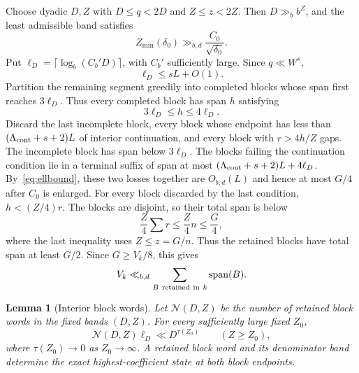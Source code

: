 \documentclass[a4paper,10pt]{amsart}
\newtheorem{lemma}[theorem]{Lemma}
\theoremstyle{remark}
\newcommand{\Span}{\operatorname{span}}
\begin{document}
Choose dyadic $D,Z$ with $D\le q<2D$ and $Z\le z<2Z$. Then
$D\gg_b b^Z$, and the least admissible band satisfies
\begin{equation}\label{eq:zmin}
 Z_{\min}(\delta_0)\gg_{b,d}\frac{C_0}{\sqrt{\delta_0}}.
\end{equation}
Put $\ell_D=\lceil\log_b(C_b'D)\rceil$, with $C_b'$ sufficiently large. Since
$q\ll W^s$,
\begin{equation}\label{eq:ellbound}
 \ell_D\le sL+O(1).
\end{equation}
Partition the remaining segment greedily into completed blocks whose span
first reaches $3\ell_D$. Thus every completed block has span $h$ satisfying
\begin{equation}\label{eq:blockspan}
 3\ell_D\le h\le4\ell_D.
\end{equation}
Discard the last incomplete block, every block whose endpoint has less than
$(\Lambda_{\rm cont}+s+2)L$ of interior continuation, and every block with
$r>4h/Z$ gaps. The incomplete block has span below $3\ell_D$. The blocks
failing the continuation condition lie in a terminal suffix of span at most
$(\Lambda_{\rm cont}+s+2)L+4\ell_D$. By~\eqref{eq:ellbound}, these two losses
together are $O_{b,d}(L)$ and hence at most $G/4$ after $C_0$ is enlarged.
For every block discarded by the last condition, $h<(Z/4)r$. The blocks are
disjoint, so their total span is below
\[
 \frac Z4\sum r\le\frac Z4n\le\frac G4,
\]
where the last inequality uses $Z\le z=G/n$. Thus the retained blocks have
total span at least $G/2$. Since $G\ge V_k/8$, this gives
\begin{equation}\label{eq:cover}
 V_k\ll_{b,d}\sum_{B\ {\rm retained\ in}\ k}\Span(B).
\end{equation}

\begin{lemma}[Interior block words]\label{lem:blocks}
Let $\mathcal N(D,Z)$ be the number of retained block words in the fixed
bands $(D,Z)$.
For every sufficiently large fixed $Z_0$,
\begin{equation}\label{eq:blockentropy}
 \mathcal N(D,Z)\ell_D\ll D^{\tau(Z_0)}
 \qquad(Z\ge Z_0),
\end{equation}
where $\tau(Z_0)\to0$ as $Z_0\to\infty$. A retained block word and its
denominator band determine the exact highest-coefficient state at both block
endpoints.
\end{lemma}
\end{document}
